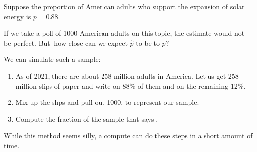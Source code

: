 \documentclass{beamer}
\begin{document}
\begin{frame}
  \begin{example}\label{solar energy}
    \vspace{-2mm} %
    Suppose the proportion of American adults who support the expansion of solar energy is $p=0.88$.\pause

    \vspace{1mm}
    If we take a poll of 1000 American adults on this topic, the estimate would not be perfect. But, how close can we expect $\hat{p}$ to be to $p$?\pause

    \vspace{1mm}
    We can simulate such a sample:
    \begin{enumerate}
    \item As of 2021, there are about 258 million adults in America. Let us get 258 million slips of paper and write  on 88\% of them and  on the remaining 12\%.\pause
    \item Mix up the slips and pull out 1000, to represent our sample.\pause
    \item Compute the fraction of the sample that says .\pause
    \end{enumerate}
  \end{example}

  \begin{note}
    While this method seems silly, a compute can do these steps in a short amount of time.
  \end{note}
\end{frame}
\end{document}
